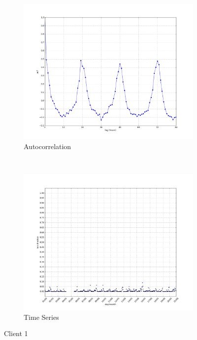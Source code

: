 \begin{figure}[H]
    \centering
    \begin{subfigure}[b]{0.5\textwidth}
        \centering
        \includegraphics[width=1.0\textwidth]{./figures/acf_NHODTCSRV04_64:66:B3:50:05:BC.png}
        \caption{Autocorrelation}
    \end{subfigure}%
    ~ 
    \begin{subfigure}[b]{0.5\textwidth}
        \centering
        \includegraphics[width=1.0\textwidth]{./figures/ts_NHODTCSRV04_64:66:B3:50:05:BC.png}
        \caption{Time Series}
    \end{subfigure}
    \caption{Client 1}
    \label{fig:acf_ts_1}
\end{figure}

